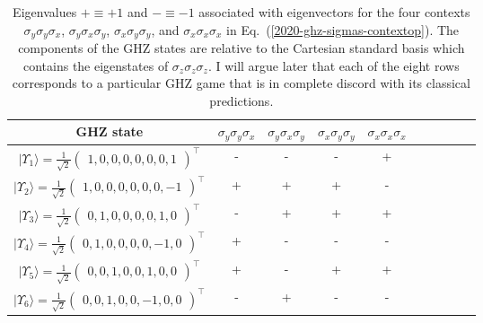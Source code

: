 \documentclass[sn-mathphys]{sn-jnl}%
\theoremstyle{thmstyleone}%
\theoremstyle{thmstyletwo}%
\theoremstyle{thmstylethree}%
\begin{document}
\begin{table}[t]%
 \begin{center}
 \caption{\label{2020-hardy-t-eveeva}  Eigenvalues $+ \equiv +1$ and $- \equiv -1$ associated with eigenvectors for the four contexts
$\sigma_y \sigma_y \sigma_x$, $\sigma_y \sigma_x \sigma_y$, $\sigma_x \sigma_y \sigma_y$,  and $\sigma_x \sigma_x \sigma_x$
in Eq.~(\ref{2020-ghz-sigmas-contextop}).
The components of the GHZ states are relative to the Cartesian standard basis which contains the eigenstates of $\sigma_z\sigma_z\sigma_z$.
I will argue later that each of the eight rows corresponds to a particular GHZ game that is in complete discord with its classical predictions.}
 \begin{tabular}{ c c c c c c c c c c }
\toprule
GHZ state &
$\sigma_y \sigma_y \sigma_x$ & $\sigma_y \sigma_x \sigma_y$ &  $\sigma_x \sigma_y \sigma_y$  & $\sigma_x \sigma_x \sigma_x$
\\
\midrule
$\vert \Upsilon_1 \rangle = \frac{1}{\sqrt{2}}\begin{pmatrix} 1, 0, 0, 0, 0, 0, 0, 1 \end{pmatrix}^\intercal $ & {\Large -} & {\Large -} &  {\Large -} & {\Large +}\\
$\vert \Upsilon_2 \rangle = \frac{1}{\sqrt{2}}\begin{pmatrix} 1, 0, 0, 0, 0, 0, 0, -1 \end{pmatrix}^\intercal$ & {\Large +} & {\Large +} &  {\Large +} & {\Large -}\\
$\vert \Upsilon_3 \rangle = \frac{1}{\sqrt{2}}\begin{pmatrix} 0, 1, 0, 0, 0, 0, 1, 0 \end{pmatrix}^\intercal $ & {\Large -} & {\Large +} &  {\Large +} & {\Large +}\\
$\vert \Upsilon_4 \rangle = \frac{1}{\sqrt{2}}\begin{pmatrix} 0, 1, 0, 0, 0, 0, -1, 0 \end{pmatrix}^\intercal$ & {\Large +} & {\Large -} &  {\Large -} & {\Large -}\\
$\vert \Upsilon_5 \rangle = \frac{1}{\sqrt{2}}\begin{pmatrix} 0, 0, 1, 0, 0, 1, 0, 0 \end{pmatrix}^\intercal $ & {\Large +} & {\Large -} &  {\Large +} & {\Large +}\\
$\vert \Upsilon_6 \rangle = \frac{1}{\sqrt{2}}\begin{pmatrix} 0, 0, 1, 0, 0, -1, 0, 0 \end{pmatrix}^\intercal$ & {\Large -} & {\Large +} &  {\Large -} & {\Large -}\\

\end{tabular}
\end{center}
\end{table}
\end{document}
